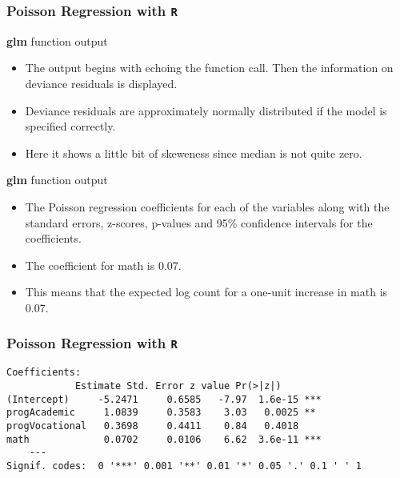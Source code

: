 \documentclass[MASTER.tex]{subfiles}
\begin{document}
\begin{frame}[fragile]
\frametitle{Poisson Regression with \texttt{R}}
\Large 
\textbf{glm} function output
\begin{itemize}
 \item The output begins with echoing the function call. Then the information on deviance residuals is displayed. 
 \item Deviance residuals are approximately normally distributed if the model is specified correctly.
 \item Here it shows a little bit of skeweness since median is not quite zero. 
\end{itemize}
\end{frame}
\begin{frame}
\Large 
\textbf{glm} function output
\begin{itemize}
\item The Poisson regression coefficients for each of the variables along with the standard errors, z-scores, p-values 
and 95\% confidence intervals for the coefficients. 
\item The coefficient for math is 0.07.
\item This means that the expected log count for a one-unit increase in math is 0.07. 
\end{itemize}
\end{frame}
\begin{frame}[fragile]
\frametitle{Poisson Regression with \texttt{R}}
\begin{verbatim}
Coefficients:
			Estimate Std. Error z value Pr(>|z|)    
(Intercept)     -5.2471     0.6585   -7.97  1.6e-15 ***
progAcademic     1.0839     0.3583    3.03   0.0025 ** 
progVocational   0.3698     0.4411    0.84   0.4018    
math             0.0702     0.0106    6.62  3.6e-11 ***
	---
Signif. codes:  0 '***' 0.001 '**' 0.01 '*' 0.05 '.' 0.1 ' ' 1
			
\end{verbatim}
\end{frame}
\end{document}
